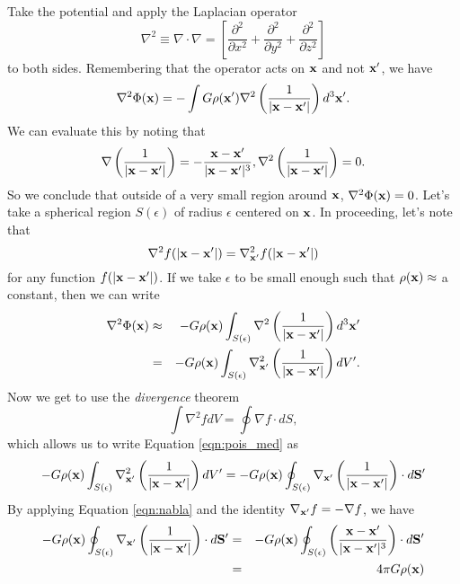 \documentclass[]{article}
\begin{document}
Take the potential and apply the Laplacian operator 
\begin{equation}
\nabla^{2} \equiv \nabla \cdot \nabla = \left[\frac{\partial^{2}}{\partial x^{2}}+\frac{\partial^{2}}{\partial y^{2}}+\frac{\partial^{2}}{\partial z^{2}}\right]
\end{equation}
\noindent
to both sides.  Remembering that the operator acts on $\mathbf{x}$ and not $\mathbf{x}'$, we have
\begin{equation}
\label{eqn:pois_init}
\nabla^{2} \Phi(\mathbf{x}) = - \int G \rho(\mathbf{x}') \nabla^{2} \left(\frac{1}{|\mathbf{x}-\mathbf{x}'|}\right)d^{3}\mathbf{x}'.
\end{equation}
\noindent
We can evaluate this by noting that
\begin{equation}
\label{eqn:nabla}
\nabla\left(\frac{1}{|\mathbf{x} - \mathbf{x}'|}\right) = -\frac{\mathbf{x}-\mathbf{x}'}{|\mathbf{x}-\mathbf{x}'|^3}, \nabla^{2}\left(\frac{1}{|\mathbf{x} - \mathbf{x}'|}\right) = 0.
\end{equation}
\noindent
So we conclude that outside of a very small region around $\mathbf{x}$, $\nabla^{2}\Phi(\mathbf{x})=0$.
Let's take a spherical region $S(\epsilon)$ of radius $\epsilon$ centered on $\mathbf{x}$. In proceeding, let's 
note that 
\begin{equation}
\nabla^{2} f(|\mathbf{x}-\mathbf{x}'|) = \nabla_{\mathbf{x}'}^{2} f(|\mathbf{x}-\mathbf{x}'|)
\end{equation}
\noindent
for any function $f(|\mathbf{x} - \mathbf{x}'|)$. If we take $\epsilon$ to be small enough such 
that $\rho(\mathbf{x})\approx$ a constant, then we can write
\begin{eqnarray}
\label{eqn:pois_med}
\nabla^{2}\Phi(\mathbf{x}) &\approx& - G\rho(\mathbf{x}) \int_{S(\epsilon)} \nabla^2 \left( \frac{1}{|\mathbf{x} - \mathbf{x}'|} \right)d^{3}\mathbf{x}' \nonumber \\
&=& - G \rho(\mathbf{x})  \int_{S(\epsilon)} \nabla_{\mathbf{x}'}^2 \left( \frac{1}{|\mathbf{x} - \mathbf{x}'|} \right)d V'.
\end{eqnarray}
\noindent
Now we get to use the {\it divergence} theorem
\begin{equation}
\int \nabla^{2} f dV = \oint \nabla f \cdot dS,
\end{equation}
\noindent
which allows us to write Equation \ref{eqn:pois_med} as
\begin{equation}
- G \rho(\mathbf{x})  \int_{S(\epsilon)} \nabla_{\mathbf{x}'}^2 \left( \frac{1}{|\mathbf{x} - \mathbf{x}'|} \right)d V' = - G \rho(\mathbf{x}) \oint_{S(\epsilon)} \nabla_{\mathbf{x}'}\left(\frac{1}{|\mathbf{x}-\mathbf{x}'|}\right) \cdot d\mathbf{S}'
\end{equation}
\noindent
By applying Equation \ref{eqn:nabla} and the identity $\nabla_{\mathbf{x}'} f = -\nabla f$, we have
\begin{eqnarray}
- G \rho(\mathbf{x}) \oint_{S(\epsilon)} \nabla_{\mathbf{x}'}\left(\frac{1}{|\mathbf{x}-\mathbf{x}'|}\right) \cdot d\mathbf{S}' &=&
-G \rho(\mathbf{x}) \oint_{S(\epsilon)} \left(\frac{\mathbf{x}-\mathbf{x}'}{|\mathbf{x}-\mathbf{x}'|^{3}}\right) \cdot d\mathbf{S}' \nonumber \\
&=& 4 \pi G \rho(\mathbf{x})
\end{eqnarray}
\end{document}
